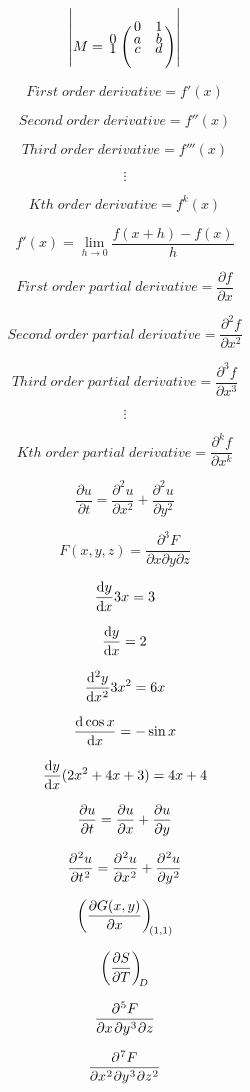 \documentclass[a4paper,12pt]{article}
\begin{document}
\begin{center}
\color{orange}
\[
	\begin{vmatrix}
	M=\bordermatrix{~ & 0 & 1 \cr
	0 & a & b \cr
	1 & c & d \cr}
	\end{vmatrix}
\]

\color{blue}
\[
	First \;  order \; derivative = f'(x) %
\]

\[
	Second \; order \; derivative = f''(x) %
\]

\[
	Third \; order \; derivative = f'''(x)
\]

\[
	\vdots
\]

\[
	Kth \; order \; derivative =f^{k}(x)
\]

\[
	f'(x)=\lim\limits_{h \rightarrow 0} \frac{f(x+h)-f(x)}{h}	
\]

\[
	First\; order \; partial \; derivative = \frac{\partial f}{\partial x}
\]

\[
	Second\; order \; partial \; derivative = \frac{\partial^2 f}{\partial x^2}
\]

\[
	Third \; order \; partial  \; derivative =\frac{\partial^3 f}{\partial x^3}
\]

\[
	\vdots
\]

\[
	Kth \; order \; partial \; derivative =\frac{\partial^k f}{\partial x^k}
\]

\[
	\frac{\partial u}{\partial t} = \frac{\partial^2 u}{\partial x^2} + \frac{\partial^2 u}{\partial y^2}
\]



\[
	F(x,y,z) = \frac{\partial^3 F}{\partial x \partial y \partial z}
\]


\[
	\diff[1]yx 3x = 3
\]

\[
	\diff{y}{x} = 2
\]

\[
	\diff[2]yx 3x^2 = 6x
\]

\[
	\diff{\cos x}x = -\sin x
\]

\[
	\diff[1]yx (2x^2 + 4x + 3) = 4x + 4
\]


\[
	\diffp{u}{t} = \diffp{u}{x} + \diffp{u}{y}
\]


\[
	\diffp[2]ut = \diffp[2]ux + \diffp[2]uy
\]

\[
	\diffp {G(x,y)}x[(1,1)]
\]

\[
	\diffp ST[D]
\]

\[
	\diffp[1,3]F{x,y,z}
\]

\[
	\diffp[2,3,2]F{x,y,z}
\]
\end{center}
\end{document}

